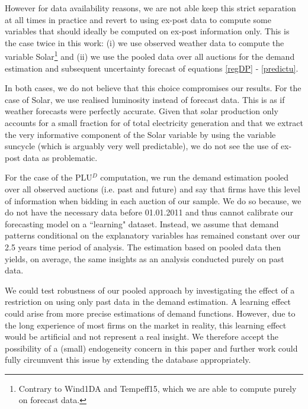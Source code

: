 However for data availability reasons, we are not able keep this strict separation at all times in practice and revert to using ex-post data to compute some variables that should ideally be computed on ex-post information only. This is the case twice in this work: (i) we use observed weather data to compute the variable Solar\footnote{Contrary to Wind1DA and Tempeff15, which we are able to compute purely on forecast data.} and (ii) we use the pooled data over all auctions for the demand estimation and subsequent uncertainty forecast of equations \ref{regDP} - \ref{predictu}. 

In both cases, we do not believe that this choice compromises our results.
For the case of Solar, we use realised luminosity instead of forecast data. This is as if weather forecasts were perfectly accurate. 
Given that solar production only accounts for a small fraction for of total electricity generation and that we extract the very informative component of the Solar variable by using the variable suncycle (which is arguably very well predictable), we do not see the use of ex-post data as problematic. 

For the case of the PLU$^D$ computation,  we run the demand estimation pooled over all observed auctions (i.e. past and future) and say that firms have this level of information when bidding in each auction of our sample. We do so because, we do not have the necessary data before 01.01.2011 and thus cannot calibrate our forecasting model on a ``learning" dataset. Instead, we assume that demand patterns conditional on the explanatory variables has remained constant over our 2.5 years time period of analysis. 
The estimation based on pooled data then yields, on average, the same insights as an analysis conducted purely on past data. 


We could test robustness of our pooled approach by investigating the effect of a restriction on using only past data in the demand estimation. A learning effect could arise from more precise estimations of demand functions. However, due to the long experience of most firms on the market in reality, this learning effect would be artificial and not represent a real insight. We therefore accept the possibility of a (small) endogeneity concern in this paper and further work could fully circumvent this issue by extending the database appropriately. 



